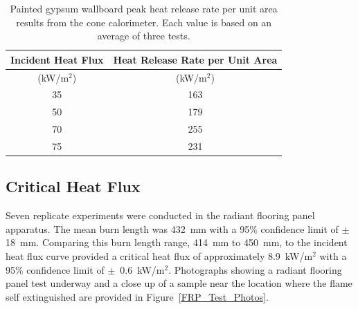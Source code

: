 \documentclass[twoside]{uocthesis}
\begin{document}
{\begin{table}
	\centering
	\begin{tabular}{|c|c|}
		\hline Incident Heat Flux & Heat Release Rate per Unit Area    \\
		\hline (kW/m$^2$) & (kW/m$^2$)  \\ \hline
		\hline 35 	& 163 	\\
		\hline 50	& 179   \\
		\hline 70	& 255  	\\
		\hline 75	& 231 	\\
		\hline
	\end{tabular}
	\caption[Painted gypsum wallboard peak heat release rate per unit area results]{Painted gypsum wallboard peak heat release rate per unit area results from the cone calorimeter. Each value is based on an average of three tests.}
	\label{tab:Gypsum wallboard_HRRA}
\end{table}

\subsection{Critical Heat Flux}

Seven replicate experiments were conducted in the radiant flooring panel apparatus.  The mean burn length was 432~mm with a 95$\%$ confidence limit of $\pm$18~mm. Comparing this burn length range, 414~mm to 450~mm, to the incident heat flux curve provided a critical heat flux of approximately 8.9~kW/m$^2$ with a 95$\%$ confidence limit of $\pm$~0.6~kW/m$^2$.  Photographs showing a radiant flooring panel test underway and a close up of a sample near the location where the flame self extinguished are provided in Figure~\ref{FRP_Test_Photos}. 

}
\end{document}
